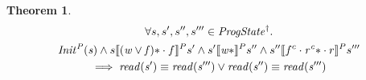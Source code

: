 \documentclass[a4paper,11pt]{article}
\newtheorem{theorem}{Theorem}[section]
\theoremstyle{definition}
\begin{document}
\begin{theorem}
\begin{multline*}
      \forall s, s', s'', s''' \in \mathit{ProgState^\dagger} \ldotp\\\mathit{Init^P(s)} \land s \llbracket \mathit{(w \lor f)\ast} \cdot f \rrbracket^P s' \land
      s' \llbracket \mathit{w\ast} \rrbracket^P s'' \land
      s'' \llbracket f^c \cdot \mathit{r^c\ast} \cdot r \rrbracket^P s'''\\
      \implies \mathit{read(s')} \equiv \mathit{read(s''')} \lor \mathit{read(s'')} \equiv \mathit{read(s''')}
\end{multline*}
\end{theorem}
\end{document}
